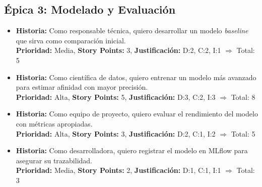 \documentclass[
11pt, %
]{charter}
\begin{document}
\subsection*{\'Epica 3: Modelado y Evaluación}
\begin{itemize}
  \item \textbf{Historia:} Como responsable técnica, quiero desarrollar un modelo \textit{baseline} que sirva como comparación inicial.\\
  \textbf{Prioridad:} Media, \textbf{Story Points:} 3, \textbf{Justificación:} D:2, C:2, I:1 $\Rightarrow$ Total: 5

  \item \textbf{Historia:} Como científica de datos, quiero entrenar un modelo más avanzado para estimar afinidad con mayor precisión.\\
  \textbf{Prioridad:} Alta, \textbf{Story Points:} 5, \textbf{Justificación:} D:3, C:2, I:3 $\Rightarrow$ Total: 8

  \item \textbf{Historia:} Como equipo de proyecto, quiero evaluar el rendimiento del modelo con métricas apropiadas.\\
  \textbf{Prioridad:} Alta, \textbf{Story Points:} 3, \textbf{Justificación:} D:2, C:1, I:2 $\Rightarrow$ Total: 5

  \item \textbf{Historia:} Como desarrolladora, quiero registrar el modelo en MLflow para asegurar su trazabilidad.\\
  \textbf{Prioridad:} Media, \textbf{Story Points:} 2, \textbf{Justificación:} D:1, C:1, I:1 $\Rightarrow$ Total: 3
\end{itemize}
\end{document}
